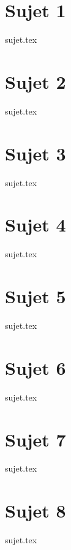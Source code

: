 \documentclass[a4paper, 11pt]{book}
\begin{document}

\resetQ
\chapter{Sujet 1}
{sujet.tex}


\resetQ
\chapter{Sujet 2}
{sujet.tex}


\resetQ
\chapter{Sujet 3}
{sujet.tex}


\resetQ
\chapter{Sujet 4}
{sujet.tex}


\resetQ
\chapter{Sujet 5}
{sujet.tex}


\resetQ
\chapter{Sujet 6}
{sujet.tex}


\resetQ
\chapter{Sujet 7}
{sujet.tex}


\resetQ
\chapter{Sujet 8}
{sujet.tex}
\end{document}
